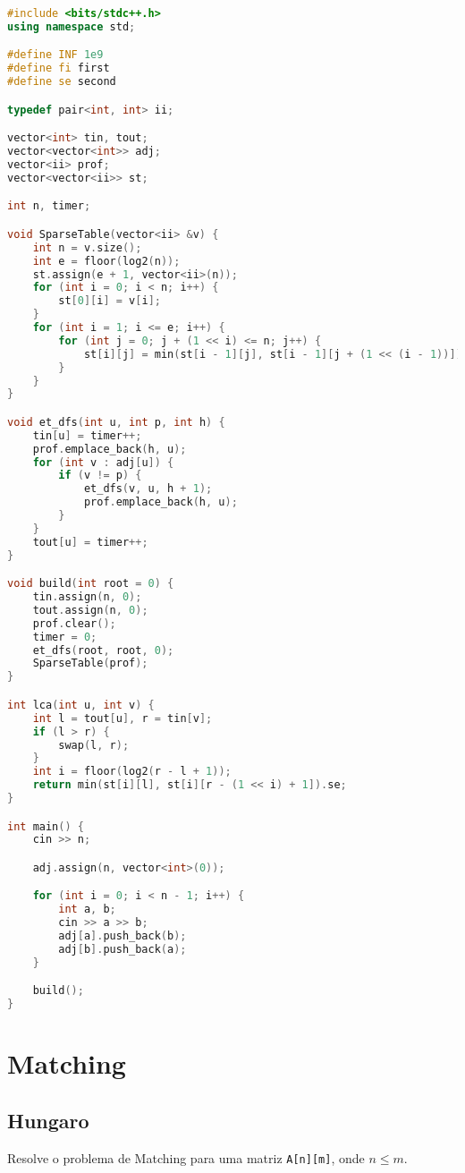 \documentclass[10pt, a4paper, oneside]{book}
\begin{document}
\begin{lstlisting}[language=C++]
#include <bits/stdc++.h>
using namespace std;

#define INF 1e9
#define fi first
#define se second

typedef pair<int, int> ii;

vector<int> tin, tout;
vector<vector<int>> adj;
vector<ii> prof;
vector<vector<ii>> st;

int n, timer;

void SparseTable(vector<ii> &v) {
    int n = v.size();
    int e = floor(log2(n));
    st.assign(e + 1, vector<ii>(n));
    for (int i = 0; i < n; i++) {
        st[0][i] = v[i];
    }
    for (int i = 1; i <= e; i++) {
        for (int j = 0; j + (1 << i) <= n; j++) {
            st[i][j] = min(st[i - 1][j], st[i - 1][j + (1 << (i - 1))]);
        }
    }
}

void et_dfs(int u, int p, int h) {
    tin[u] = timer++;
    prof.emplace_back(h, u);
    for (int v : adj[u]) {
        if (v != p) {
            et_dfs(v, u, h + 1);
            prof.emplace_back(h, u);
        }
    }
    tout[u] = timer++;
}

void build(int root = 0) {
    tin.assign(n, 0);
    tout.assign(n, 0);
    prof.clear();
    timer = 0;
    et_dfs(root, root, 0);
    SparseTable(prof);
}

int lca(int u, int v) {
    int l = tout[u], r = tin[v];
    if (l > r) {
        swap(l, r);
    }
    int i = floor(log2(r - l + 1));
    return min(st[i][l], st[i][r - (1 << i) + 1]).se;
}

int main() {
    cin >> n;

    adj.assign(n, vector<int>(0));

    for (int i = 0; i < n - 1; i++) {
        int a, b;
        cin >> a >> b;
        adj[a].push_back(b);
        adj[b].push_back(a);
    }

    build();
}
\end{lstlisting}
\hfill

\section{Matching}
\subsection{Hungaro}


Resolve o problema de Matching para uma matriz \lstinline{A[n][m]}, onde $n \leq m$.
\end{document}
